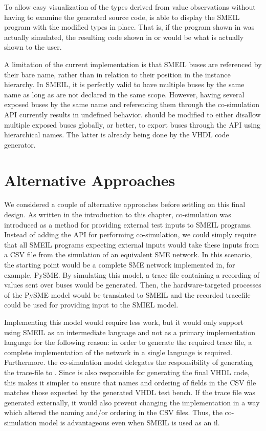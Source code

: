 To allow easy visualization of the types derived from value observations without
having to examine the generated source code, \libsme{} is able to display the
SMEIL program with the modified types in place. That is, if the program shown in
 was actually simulated, the resulting code shown in
 or  would be what is actually shown
to the user.

A limitation of the current implementation is that SMEIL buses are referenced by
their bare name, rather than in relation to their position in the instance
hierarchy. In SMEIL, it is perfectly valid to have multiple buses by the same
name as long as are not declared in the same scope. However, having several
{\ttfamily exposed} buses by the same name and referencing them through the
co-simulation API currently results in undefined behavior. \libsme{} should be
modified to either disallow multiple {\ttfamily exposed} buses globally, or
better, to export buses through the API using hierarchical names. The latter is
already being done by the VHDL code generator.

\section{Alternative Approaches}
We considered a couple of alternative approaches before settling on this final
design. As written in the introduction to this chapter, co-simulation was
introduced as a method for providing external test inputs to SMEIL programs.
Instead of adding the API for performing co-simulation, we could simply require
that all SMEIL programs expecting external inputs would take these inputs from a
CSV file from the simulation of an equivalent SME network. In this scenario, the
starting point would be a complete SME network implemented in, for example,
PySME. By simulating this model, a trace file containing a recording of values
sent over buses would be generated. Then, the hardware-targeted processes of the
PySME model would be translated to SMEIL and the recorded tracefile could be
used for providing input to the SMIEL model.

Implementing this model would require less
work, but it would only support using SMEIL as an intermediate language and not
as a primary implementation language for the following reason: in order to
generate the required trace file, a complete implementation of the network in a
single language is required. Furthermore. the co-simulation model delegates the
responsibility of generating the trace-file to \libsme{}. Since \libsme{} is
also responsible for generating the final VHDL code, this makes it simpler to
ensure that names and ordering of fields in the CSV file matches those expected
by the generated VHDL test bench. If the trace file was generated externally, it
would also prevent changing the \libsme{} implementation in a way which altered
the naming and/or ordering in the CSV files. Thus, the co-simulation model is
advantageous even when SMEIL is used as an \gls{il}.

